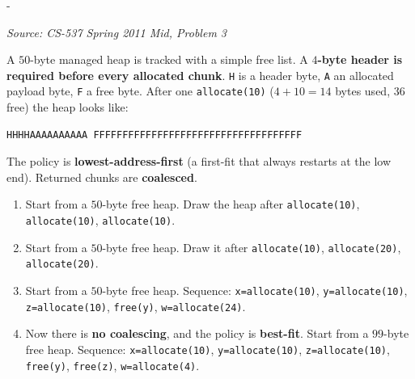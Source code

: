 \documentclass[11pt,a4paper]{article}
\makeatletter
\newcommand{\keepspace}[1]{\par\penalty-100\begingroup
  \setlength{\dimen@}{#1}\dimen@ii\pagegoal\advance\dimen@ii-\pagetotal
  \ifdim\dimen@>\dimen@ii\ifdim\dimen@ii>\z@\vfil\fi\break\fi\endgroup}
\newcounter{qn}[section]
\newenvironment{Qn}[4]{%
  \refstepcounter{qn}\keepspace{7\baselineskip}%
  \begin{tcolorbox}[qboxstyle, title={Q\thesection.\theqn\ \ [#1 \textbar\ #2]\ \ #4}]%
  {\footnotesize\color{g3}\textit{Source: #3}}\par\smallskip%
}{%
  \end{tcolorbox}%
}
\makeatother
\begin{document}
\begin{Qn}{Hard}{Lect 11}{CS-537 Spring 2011 Mid, Problem 3}{Allocator headers, splitting, coalescing, and best-fit}
A $50$-byte managed heap is tracked with a simple free list. A
\textbf{$4$-byte header is required before every allocated chunk}.
\texttt{H} is a header byte, \texttt{A} an allocated payload byte,
\texttt{F} a free byte. After one \texttt{allocate(10)} ($4+10=14$ bytes used, $36$ free) the heap looks like:
\begin{lstlisting}[numbers=none]
HHHHAAAAAAAAAA FFFFFFFFFFFFFFFFFFFFFFFFFFFFFFFFFFFF
\end{lstlisting}
The policy is \textbf{lowest-address-first} (a first-fit that always
restarts at the low end). Returned chunks are \textbf{coalesced}.
\begin{enumerate}
  \item[(a)] Start from a $50$-byte free heap. Draw the heap after
        \texttt{allocate(10)}, \texttt{allocate(10)},
        \texttt{allocate(10)}.
  \item[(b)] Start from a $50$-byte free heap. Draw it after
        \texttt{allocate(10)}, \texttt{allocate(20)},
        \texttt{allocate(20)}.
  \item[(c)] Start from a $50$-byte free heap. Sequence:
        \texttt{x=allocate(10)}, \texttt{y=allocate(10)},
        \texttt{z=allocate(10)}, \texttt{free(y)},
        \texttt{w=allocate(24)}.
  \item[(d)] Now there is \textbf{no coalescing}, and the policy is
        \textbf{best-fit}. Start from a $99$-byte free heap. Sequence:
        \texttt{x=allocate(10)}, \texttt{y=allocate(10)},
        \texttt{z=allocate(10)}, \texttt{free(y)}, \texttt{free(z)},
        \texttt{w=allocate(4)}.
\end{enumerate}
\end{Qn}
\end{document}
